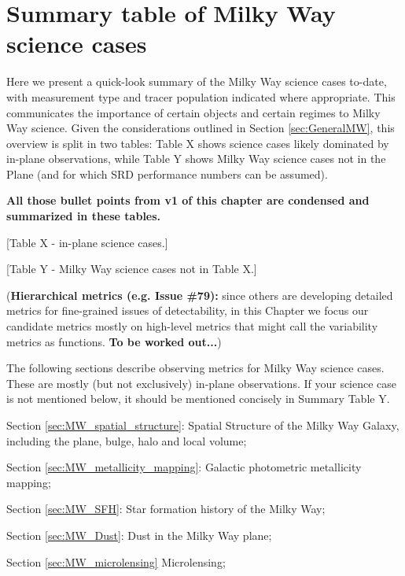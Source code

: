 \section{Summary table of Milky Way science cases}
\def\secname{SummaryTableMW}\label{sec:\secname}

Here we present a quick-look summary of the Milky Way science cases
to-date, with measurement type and tracer population indicated where
appropriate. This communicates the importance of certain objects and
certain regimes to Milky Way science. Given the considerations
outlined in Section \ref{sec:GeneralMW}, this overview is split in two
tables: Table X shows science cases likely dominated by in-plane
observations, while Table Y shows Milky Way science cases not in the
Plane (and for which SRD performance numbers can be assumed).

{\bf All those bullet points from v1 of this chapter are condensed and summarized in these tables.}

[Table X - in-plane science cases.]

[Table Y - Milky Way science cases not in Table X.]

({\bf Hierarchical metrics (e.g. Issue \#79):} since others are
developing detailed metrics for fine-grained issues of detectability,
in this Chapter we focus our candidate metrics mostly on high-level
metrics that might call the variability metrics as functions. {\bf To
  be worked out...})

The following sections describe observing metrics for Milky Way
science cases. These are mostly (but not exclusively) in-plane
observations. If your science case is not mentioned below, it should
be mentioned concisely in Summary Table Y.


Section \ref{sec:MW_spatial_structure}: Spatial Structure of the Milky Way Galaxy, including the plane, bulge, halo and local volume;

Section \ref{sec:MW_metallicity_mapping}: Galactic photometric metallicity mapping; 

Section \ref{sec:MW_SFH}: Star formation history of the Milky Way;

Section \ref{sec:MW_Dust}: Dust in the Milky Way plane;

Section \ref{sec:MW_microlensing} Microlensing;

